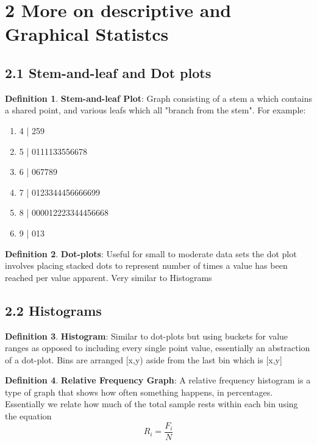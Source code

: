 \documentclass[12pt]{amsart}
\theoremstyle{definition}
\newtheorem{definition}{Definition} %
\numberwithin{equation}{theorem}    %
\begin{document}
\section*{2 More on descriptive and Graphical Statistcs}

\subsection*{2.1 Stem-and-leaf and Dot plots}

\begin{definition}
    
    \textbf{Stem-and-leaf Plot}:
    Graph consisting of a stem a which contains a shared point, and various leafs which all "branch from the stem". For example: 
    \begin{enumerate}
        \item 4 | 259 
        \item 5 | 0111133556678
        \item 6 | 067789
        \item 7 | 0123344456666699
        \item 8 | 000012223344456668
        \item 9 | 013
    \end{enumerate} 
\end{definition}

\begin{definition}
    \textbf{Dot-plots}:
    Useful for small to moderate data sets the dot plot involves placing stacked dots to represent number of times a value has been reached per value apparent. Very similar to Histograms
\end{definition}

\subsection*{2.2 Histograms}

\begin{definition}
    \textbf{Histogram}:
    Similar to dot-plots but using buckets for value ranges as opposed to including every single point value, essentially an abstraction of a dot-plot.
    Bins are arranged [x,y) aside from the last bin which is [x,y]
\end{definition}

\begin{definition}
    \textbf{Relative Frequency Graph}:
    A relative frequency histogram is a type of graph that shows how often something happens, in percentages. Essentially we relate how much of the total sample rests within each bin using the equation $$R_i = \frac{F_i}{N}$$
\end{definition}
\end{document}
